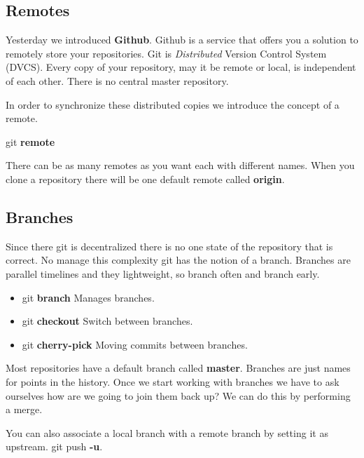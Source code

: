 \documentclass{beamer}
\begin{document}
\subsection{Remotes}
\begin{frame}[fragile]
  Yesterday we introduced \textbf{Github}. Github is a service that offers you a solution to remotely store your repositories. 
  Git is \emph{Distributed} Version Control System (DVCS). Every copy of your repository, may it be remote or local, is independent of each other. There is no central master repository. 

  In order to synchronize these distributed copies we introduce the concept of a remote.
\pause
  \begin{block}{}
    git \textbf{remote}
  \end{block}
\pause
  There can be as many remotes as you want each with different names. When you clone a repository there will be one default remote called \textbf{origin}.
\end{frame}
\subsection{Branches}
\begin{frame}[fragile]
  Since there git is decentralized there is no one state of the repository that is correct. No manage this complexity git has the notion of a branch. Branches are parallel timelines and they lightweight, so branch often and branch early.
  \begin{block}{}
    \begin{itemize}
      \item git \textbf{branch}  Manages branches. 
      \item git \textbf{checkout} Switch between branches.
      \item git \textbf{cherry-pick} Moving commits between branches.
    \end{itemize}
  \end{block}
  Most repositories have a default branch called \textbf{master}. Branches are just names for points in the history.
  Once we start working with branches we have to ask ourselves how are we going to join them back up? We can do this by performing a merge.

  You can also associate a local branch with a remote branch by setting it as upstream. git push \textbf{-u}.
\end{frame}
\end{document}
